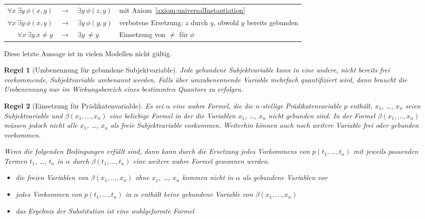 \documentclass[a4paper,german,10pt,twoside]{book}
\newtheorem{rul}{Regel}
\theoremstyle{definition}
\theoremstyle{remark}
\begin{document}
\par
\begin{tabularx}{\linewidth}{rclX}
  $\forall x \ \exists y \ \phi(x, y)$ & $\rightarrow$ & $\exists y \ \phi(z,y)$ 
    & mit Axiom~\ref{axiom:universalInstantiation} \\
  $\forall x \ \exists y \ \phi(x, y)$ & $\rightarrow$ & $\exists y \ \phi(y,y)$ 
    & verbotene Ersetzung: $z$ durch $y$, obwohl $y$ bereits gebunden \\
  $\forall x \ \exists y \ x \neq y$ & $\rightarrow$ & $\exists y \ \neq y$ 
    &  Einsetzung von $\neq$ f{\"u}r $\phi$
\end{tabularx}

\par
Diese letzte Aussage ist in vielen Modellen nicht g{\"u}ltig.


\par


\begin{rul}[Umbenennung f{\"u}r gebundene Subjektvariable]
\label{rule:renameBound} \hypertarget{rule:renameBound}{}
Jede gebundene Subjektvariable kann in eine andere, nicht bereits frei vorkommende, Subjektvariable umbenannt werden. Falls {\"u}ber umzubenennende Variable mehrfach quantifiziert wird, dann braucht die Umbenennung nur im Wirkungsbereich eines bestimmten Quantors zu erfolgen.
\end{rul}




\par


\begin{rul}[Einsetzung f{\"u}r Pr{\"a}dikatenvariable]
\label{rule:replacePred} \hypertarget{rule:replacePred}{}
Es sei $\alpha$ eine wahre Formel, die die $n$-stellige Pr{\"a}dikatenvariable $p$ enth{\"a}lt, $x_1$, \ldots, $x_n$ seien Subjektvariable und $\beta(x_1, \ldots, x_n)$ eine beliebige Formel in der die Variablen $x_1$, \ldots, $x_n$ nicht gebunden sind. In der Formel $\beta(x_1, \ldots, x_n)$ m{\"u}ssen jedoch nicht alle $x_1$, \ldots, $x_n$ als freie Subjektvariable vorkommen. 
Weiterhin k{\"o}nnen auch noch weitere Variable frei oder gebunden vorkommen. 

Wenn die folgenden Bedingungen erf{\"u}llt sind, dann kann durch die Ersetzung jedes Vorkommens von $p(t_1, \ldots, t_n)$ mit jeweils passenden Termen $t_1$, \ldots, $t_n$ in $\alpha$ durch $\beta(t_1, \ldots, t_n)$ eine weitere wahre Formel gewonnen werden.

\begin{itemize}

\item 
die freien Variablen von $\beta(x_1, \ldots, x_n)$ ohne $x_1$, \ldots, $x_n$ kommen nicht in $\alpha$ als gebundene Variablen vor

\item
jedes Vorkommen von $p(t_1, \ldots, t_n)$ in $\alpha$ enth{\"a}lt keine gebundene Variable von $\beta(x_1, \ldots, x_n)$

\item
das Ergebnis der Substitution ist eine wohlgeformte Formel

\end{itemize}
\end{rul}
\end{document}
